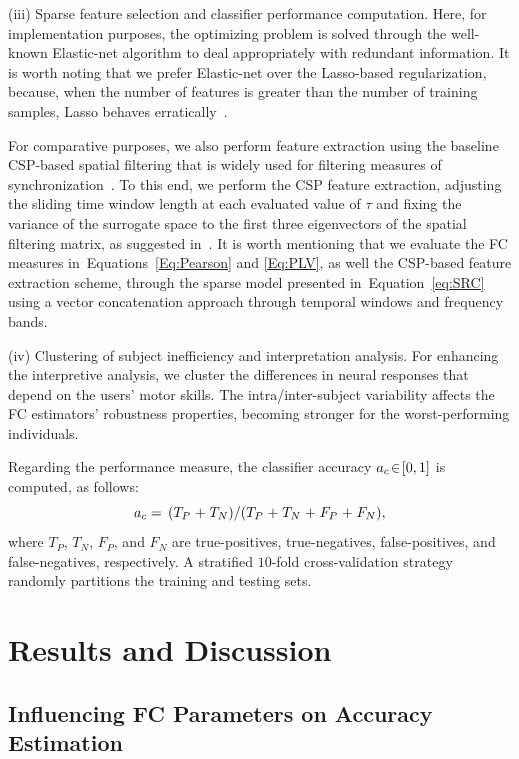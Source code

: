 ({iii}) Sparse feature selection and classifier performance computation. {Here, for implementation purposes, the optimizing problem is solved through the well-known Elastic-net algorithm to deal appropriately with redundant information. It is worth noting that we prefer Elastic-net over the Lasso-based regularization, because, when the number of features is greater than the number of training samples, Lasso behaves erratically~\cite{geron2022hands}.}

For comparative purposes, we also perform feature extraction using the baseline CSP-based spatial filtering that is widely used for filtering measures of synchronization~\cite{haddad2019early,kumar2018eeg}. To this end, we perform the CSP feature extraction, adjusting the sliding time window length at each evaluated value of $\tau$ and fixing the variance of the surrogate space to the first three eigenvectors of the spatial filtering matrix, as suggested in~\cite{lotte2018review}. It is worth mentioning that we evaluate the FC measures in~Equations~\eqref{Eq:Pearson} and \eqref{Eq:PLV}, as well the CSP-based feature extraction scheme, through the sparse model presented in~Equation~\eqref{eq:SRC} using a vector concatenation approach through temporal windows and frequency bands.

({iv}) Clustering of subject inefficiency and interpretation analysis. 
For enhancing the interpretive analysis, we cluster the differences in neural responses that depend on the users' motor skills. The intra/inter-subject variability affects the FC estimators' robustness properties, becoming stronger for the worst-performing individuals.

{Regarding the performance measure, the classifier accuracy $a_c\negthinspace\in\negthinspace[0,1]$ is computed, as follows:
$$a_c= \,(T_P \s{~+~} T_N )/ (T_P\s{~+~} T_N \s{~+~} F_P \s{~+~} F_N ),$$
 where $T_P$, $T_N$, $F_P$, and $F_N$ are true-positives, true-negatives, false-positives, and false-negatives, respectively. A stratified $10$-fold cross-validation strategy randomly partitions the training and testing sets.}

\section{Results and Discussion}

\subsection{Influencing FC Parameters on Accuracy Estimation}


